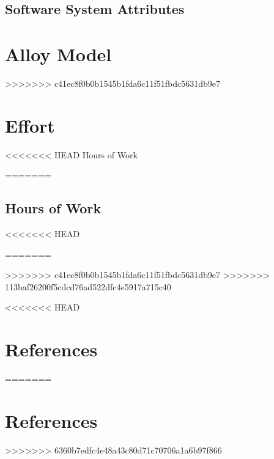 \documentclass[12pt, a4paper]{report}
\begin{document}
\section{Software System Attributes}


\chapter{Alloy Model}
\label{ch:alloy}



>>>>>>> c41ec8f0b0b1545b1fda6c11f51fbdc5631db9e7
\chapter{Effort}
\label{ch:effort}

<<<<<<< HEAD
Hours of Work

=======
\section{Hours of Work}
<<<<<<< HEAD

=======

>>>>>>> c41ec8f0b0b1545b1fda6c11f51fbdc5631db9e7
>>>>>>> 113baf26200f5cdcd76ad522dfc4e5917a715c40

<<<<<<< HEAD
\chapter{References}
\label{ch:referencs}

=======
\chapter{References}

>>>>>>> 6360b7edfc4e48a43c80d71c70706a1a6b97f866


%

%
\end{document}
